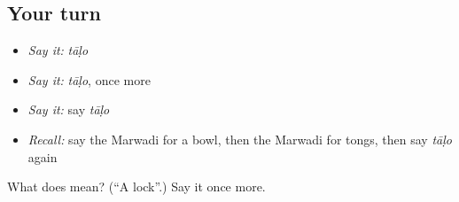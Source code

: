 \subsection*{Your turn}
\begin{itemize}
\raggedright
  \item \emph{Say it:} \emph{tāḷo}
  \item \emph{Say it:} \emph{tāḷo}, once more
  \item \emph{Say it:} say \emph{tāḷo}
  \item \emph{Recall:} say the Marwadi for a bowl, then the Marwadi for tongs, then say \emph{tāḷo} again
\end{itemize}

\begin{tcolorbox}[breakable,colback=teal!4,colframe=teal!35!black,title={Before you move on}]
What does  mean? (\textquotedblleft{}A lock\textquotedblright{}.) Say it once more.
\end{tcolorbox}
